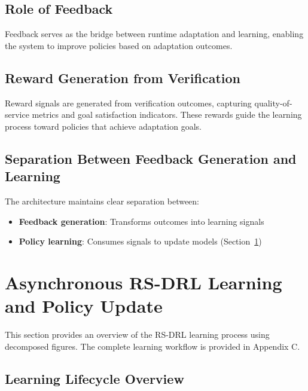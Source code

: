 \documentclass[11pt,a4paper]{article}
\begin{document}
\subsection{Role of Feedback}

Feedback serves as the bridge between runtime adaptation and learning, enabling the system to improve policies based on adaptation outcomes.

\subsection{Reward Generation from Verification}

Reward signals are generated from verification outcomes, capturing quality-of-service metrics and goal satisfaction indicators. These rewards guide the learning process toward policies that achieve adaptation goals.

\subsection{Separation Between Feedback Generation and Learning}

The architecture maintains clear separation between:
\begin{itemize}
    \item \textbf{Feedback generation}: Transforms outcomes into learning signals
    \item \textbf{Policy learning}: Consumes signals to update models (Section~\ref{sec:learning})
\end{itemize}


\section{Asynchronous RS-DRL Learning and Policy Update}
\label{sec:learning}

This section provides an overview of the RS-DRL learning process using decomposed figures. The complete learning workflow is provided in Appendix C.

\subsection{Learning Lifecycle Overview}
\end{document}
